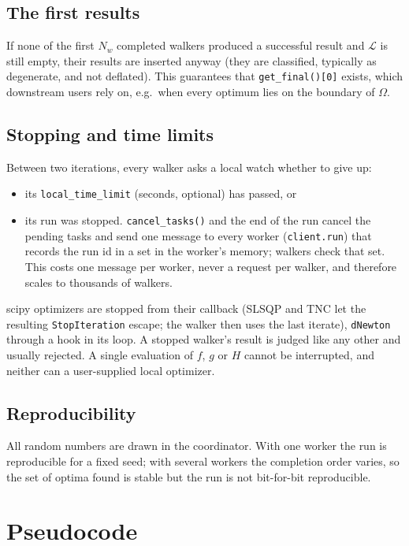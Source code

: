 \documentclass[11pt]{article}
\newcommand{\code}[1]{\texttt{#1}}
\begin{document}
\subsection{The first results}\label{sec:first}

If none of the first $N_w$ completed walkers produced a successful result and $\mathcal{L}$ is
still empty, their results are inserted anyway (they are classified, typically as degenerate,
and not deflated). This guarantees that \code{get\_final()[0]} exists, which downstream users
rely on, e.g.\ when every optimum lies on the boundary of $\Omega$.

\subsection{Stopping and time limits}

Between two iterations, every walker asks a local watch whether to give up:
\begin{itemize}
  \item its \code{local\_time\_limit} (seconds, optional) has passed, or
  \item its run was stopped. \code{cancel\_tasks()} and the end of the run cancel the pending
  tasks and send one message to every worker (\code{client.run}) that records the run id in a
  set in the worker's memory; walkers check that set. This costs one message per worker, never
  a request per walker, and therefore scales to thousands of walkers.
\end{itemize}
scipy optimizers are stopped from their callback (SLSQP and TNC let the resulting
\code{StopIteration} escape; the walker then uses the last iterate), \code{dNewton} through a
hook in its loop. A stopped walker's result is judged like any other and usually rejected. A
single evaluation of $f$, $g$ or $H$ cannot be interrupted, and neither can a user-supplied
local optimizer.

\subsection{Reproducibility}

All random numbers are drawn in the coordinator. With one worker the run is reproducible for a
fixed seed; with several workers the completion order varies, so the set of optima found is
stable but the run is not bit-for-bit reproducible.

\section{Pseudocode}\label{sec:pseudocode}
\end{document}
